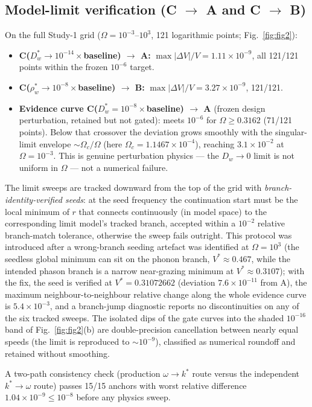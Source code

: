 \documentclass[11pt]{article}
\newcommand{\om}{\omega}
\newcommand{\Om}{\Omega}
\newcommand{\Dw}{D_w}
\newcommand{\rw}{\rho_w}
\begin{document}
\subsection{Model-limit verification (C $\to$ A and C $\to$ B)}

On the full Study-1 grid ($\Om=10^{-3}$--$10^{3}$, 121 logarithmic points; Fig.~\ref{fig:fig2}):
\begin{itemize}
\item \textbf{C($D_w^*\to10^{-14}\times$baseline) $\to$ A:} $\max|\Delta V|/V=1.11\times10^{-9}$, all 121/121 points within the frozen $10^{-6}$ target.
\item \textbf{C($\rw^*\to10^{-8}\times$baseline) $\to$ B:} $\max|\Delta V|/V=3.27\times10^{-9}$, 121/121.
\item \textbf{Evidence curve C($D_w^*=10^{-8}\times$baseline) $\to$ A} (frozen design perturbation, retained but not gated): meets $10^{-6}$ for $\Om\ge0.3162$ (71/121 points). Below that crossover the deviation grows smoothly with the singular-limit envelope $\sim\Om_c/\Om$ (here $\Om_c=1.1467\times10^{-4}$), reaching $3.1\times10^{-2}$ at $\Om=10^{-3}$. This is genuine perturbation physics --- the $\Dw\to0$ limit is not uniform in $\Om$ --- not a numerical failure.
\end{itemize}
The limit sweeps are tracked downward from the top of the grid with \emph{branch-identity-verified seeds}: at the seed frequency the continuation start must be the local minimum of $r$ that connects continuously (in model space) to the corresponding limit model's tracked branch, accepted within a $10^{-2}$ relative branch-match tolerance, otherwise the sweep fails outright. This protocol was introduced after a wrong-branch seeding artefact was identified at $\Om=10^3$ (the seedless global minimum can sit on the phonon branch, $V^*\approx0.467$, while the intended phason branch is a narrow near-grazing minimum at $V^*\approx0.3107$); with the fix, the seed is verified at $V^*=0.31072662$ (deviation $7.6\times10^{-11}$ from A), the maximum neighbour-to-neighbour relative change along the whole evidence curve is $5.4\times10^{-3}$, and a branch-jump diagnostic reports no discontinuities on any of the six tracked sweeps. The isolated dips of the gate curves into the shaded $10^{-16}$ band of Fig.~\ref{fig:fig2}(b) are double-precision cancellation between nearly equal speeds (the limit is reproduced to $\sim10^{-9}$), classified as numerical roundoff and retained without smoothing.

A two-path consistency check (production $\om\to k^*$ route versus the independent $k^*\to\om$ route) passes 15/15 anchors with worst relative difference $1.04\times10^{-9}\le10^{-8}$ before any physics sweep.
\end{document}
